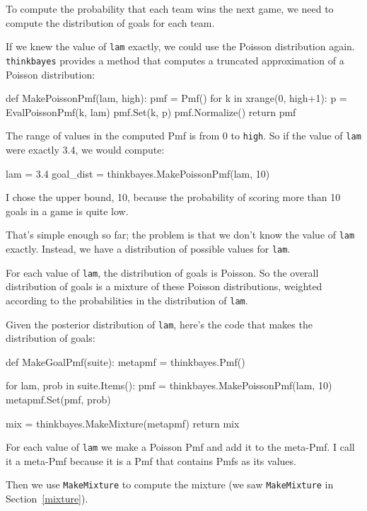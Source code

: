 \documentclass[12pt]{book}
\theoremstyle{exercise}
\begin{document}
To compute the probability that each team wins the next game,
we need to compute the distribution of goals for each team.

If we knew the value of {\tt lam} exactly, we could use the
Poisson distribution again.  \verb"thinkbayes" provides a
method that computes a truncated approximation of a Poisson
distribution:

\begin{code}
def MakePoissonPmf(lam, high):
    pmf = Pmf()
    for k in xrange(0, high+1):
        p = EvalPoissonPmf(k, lam)
        pmf.Set(k, p)
    pmf.Normalize()
    return pmf
\end{code}  

The range of values in the computed Pmf is from 0 to {\tt high}.
So if the value of {\tt lam} were exactly 3.4, we would compute:

\begin{code}
lam = 3.4
goal_dist = thinkbayes.MakePoissonPmf(lam, 10)
\end{code}

I chose the upper bound, 10, because the probability of scoring
more than 10 goals in a game is quite low.

That's simple enough so far; the problem is that we don't know
the value of {\tt lam} exactly.  Instead, we have a distribution
of possible values for {\tt lam}.

For each value of {\tt lam}, the distribution of goals is Poisson.
So the overall distribution of goals is a mixture of these
Poisson distributions, weighted according to the probabilities
in the distribution of {\tt lam}.

Given the posterior distribution of {\tt lam}, here's the code
that makes the distribution of goals:

\begin{code}
def MakeGoalPmf(suite):
    metapmf = thinkbayes.Pmf()

    for lam, prob in suite.Items():
        pmf = thinkbayes.MakePoissonPmf(lam, 10)
        metapmf.Set(pmf, prob)

    mix = thinkbayes.MakeMixture(metapmf)
    return mix
\end{code}  

For each value of {\tt lam} we make a Poisson Pmf and add it to the
meta-Pmf.  I call it a meta-Pmf because it is a Pmf that contains
Pmfs as its values.

Then we use \verb"MakeMixture" to compute the mixture
(we saw {\tt MakeMixture} in Section~\ref{mixture}).
\end{document}
